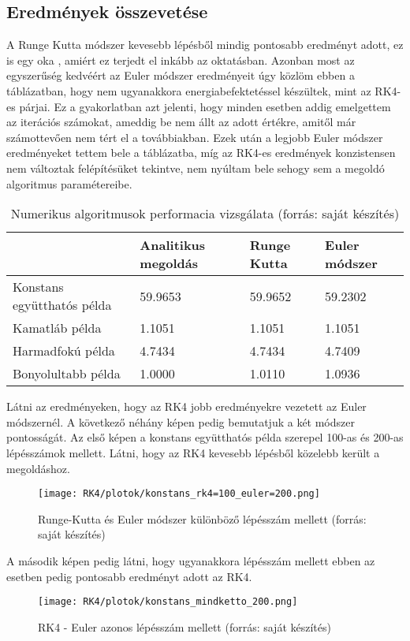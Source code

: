 \documentclass{article}
\theoremstyle{definition}
\theoremstyle{theorem}
\begin{document}
\subsection{Eredmények összevetése}
A Runge Kutta módszer kevesebb lépésből mindig pontosabb eredményt adott, ez is egy oka , amiért ez terjedt el inkább az oktatásban. Azonban most az egyszerűség kedvéért az Euler módszer eredményeit úgy közlöm ebben a táblázatban, hogy nem ugyanakkora energiabefektetéssel készültek, mint az RK4-es párjai. Ez a gyakorlatban azt jelenti, hogy minden esetben addig emelgettem az iterációs számokat, ameddig be nem állt az adott értékre, amitől már számottevően nem tért el a továbbiakban. Ezek után a legjobb Euler módszer eredményeket tettem bele a táblázatba, míg az RK4-es eredmények konzistensen nem változtak felépítésüket tekintve, nem nyúltam bele sehogy sem a megoldó algoritmus paramétereibe.
\begin{table}[H]
\caption{Numerikus algoritmusok performacia vizsgálata (forrás: saját készítés)}
\begin{tabular}{|l|l|l|l|}
\hline
                           & Analitikus megoldás & Runge Kutta & Euler módszer \\ \hline
Konstans együtthatós példa & 59.9653             & 59.9652     & 59.2302       \\ \hline
Kamatláb példa             & 1.1051              & 1.1051      & 1.1051        \\ \hline
Harmadfokú példa           & 4.7434              & 4.7434      & 4.7409        \\ \hline
Bonyolultabb példa          & 1.0000              & 1.0110      & 1.0936        \\ \hline
\end{tabular}
\end{table}
Látni az eredményeken, hogy az RK4 jobb eredményekre vezetett az Euler módszernél. A következő néhány képen pedig bemutatjuk a két módszer pontosságát. Az első képen a konstans együtthatós példa szerepel 100-as és 200-as lépésszámok mellett. Látni, hogy az RK4 kevesebb lépésből közelebb került a megoldáshoz.
\begin{figure}[!h]
    \centering
    \texttt{[image: RK4/plotok/konstans\_rk4=100\_euler=200.png]}
    \caption{Runge-Kutta és Euler módszer különböző lépésszám mellett (forrás: saját készítés)}
    \label{Rk4_euler_1}
\end{figure}

A második képen pedig látni, hogy ugyanakkora lépésszám mellett ebben az esetben pedig pontosabb eredményt adott az RK4.
\begin{figure}[h]
    \centering
    \texttt{[image: RK4/plotok/konstans\_mindketto\_200.png]}
    \caption{RK4 - Euler azonos lépésszám mellett (forrás: saját készítés)}
    \label{rk4_euler_pelda2}
\end{figure}
\end{document}

